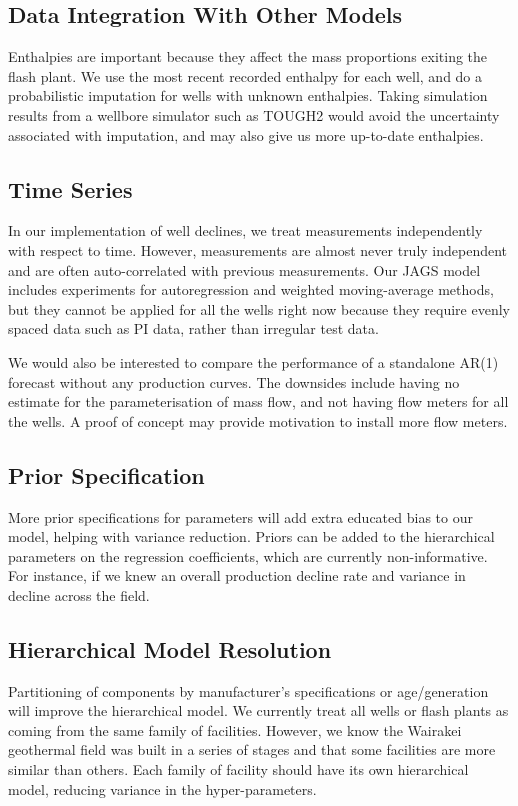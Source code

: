 \documentclass[a4paper, 12pt]{article}
\begin{document}
\subsection{Data Integration With Other Models}
Enthalpies are important because they affect the mass proportions exiting the flash plant. We use the most recent recorded enthalpy for each well, and do a probabilistic imputation for wells with unknown enthalpies. Taking simulation results from a wellbore simulator such as TOUGH2 would avoid the uncertainty associated with imputation, and may also give us more up-to-date enthalpies.

\subsection{Time Series}
In our implementation of well declines, we treat measurements independently with respect to time. However, measurements are almost never truly independent and are often auto-correlated with previous measurements. Our JAGS model includes experiments for autoregression and weighted moving-average methods, but they cannot be applied for all the wells right now because they require evenly spaced data such as PI data, rather than irregular test data.

We would also be interested to compare the performance of a standalone AR(1) forecast without any production curves. The downsides include having no estimate for the parameterisation of mass flow, and not having flow meters for all the wells. A proof of concept may provide motivation to install more flow meters.

\subsection{Prior Specification}
More prior specifications for parameters will add extra educated bias to our model, helping with variance reduction. Priors can be added to the hierarchical parameters on the regression coefficients, which are currently non-informative. For instance, if we knew an overall production decline rate and variance in decline across the field.

\subsection{Hierarchical Model Resolution}
Partitioning of components by manufacturer's specifications or age/generation will improve the hierarchical model. We currently treat all wells or flash plants as coming from the same family of facilities. However, we know the Wairakei geothermal field was built in a series of stages and that some facilities are more similar than others. Each family of facility should have its own hierarchical model, reducing variance in the hyper-parameters.
\end{document}
